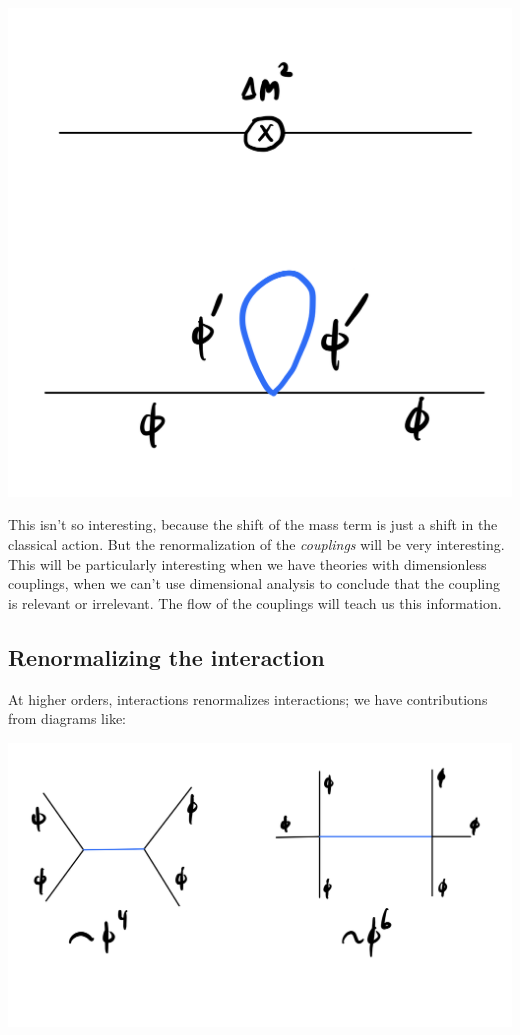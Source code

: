 \begin{center}
    \includegraphics[scale=0.3]{Lectures/Figures/lec15-masscorrection.png}
\end{center}

This isn't so interesting, because the shift of the mass term is just a shift in the classical action. But the renormalization of the \emph{couplings} will be very interesting. This will be particularly interesting when we have theories with dimensionless couplings, when we can't use dimensional analysis to conclude that the coupling is relevant or irrelevant. The flow of the couplings will teach us this information.

\subsection{Renormalizing the interaction}
At higher orders, interactions renormalizes interactions; we have contributions from diagrams like:

\begin{center}
    \includegraphics[scale=0.3]{Lectures/Figures/lec15-diagrams.png}
\end{center}

